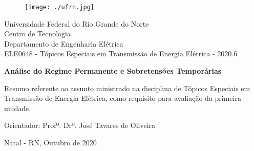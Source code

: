 \begin{titlepage}
	\begin{center}
	
	\begin{figure}[!ht]
	\centering
	\texttt{[image: ./ufrn.jpg]}
	\end{figure}

		Universidade Federal do Rio Grande do Norte \\ Centro de Tecnologia \\ Departamento de Engenharia Elétrica \\  ELE0648 - Tópicos Especiais em Transmissão de Energia Elétrica  - 2020.6 \\
\vspace{15pt}
        
        \vspace{85pt}
        
		\textbf{\Large{Análise do Regime Permanente e Sobretensões Temporárias}}\\
			
	\end{center}
\vspace{1,5cm}
	
	\begin{flushright}

   \begin{list}{}{
      \setlength{\leftmargin}{4.5cm}
      \setlength{\rightmargin}{0cm}
      \setlength{\labelwidth}{0pt}
      \setlength{\labelsep}{\leftmargin}}

      \item Resumo referente ao assunto ministrado na disciplina de Tópicos Especiais em Transmissão de Energia Elétrica, como requisito para avaliação da primeira unidade.

      \begin{list}{}{
      \setlength{\leftmargin}{0cm}
      \setlength{\rightmargin}{0cm}
      \setlength{\labelwidth}{0pt}
      \setlength{\labelsep}{\leftmargin}}


            \item Orientador: Profº. Drº. José Tavares de Oliveira

      \end{list}
   \end{list}
\end{flushright}
\vspace{1cm}
\begin{center}
		\vspace{\fill}
		 Natal - RN, Outubro de 2020
			\end{center}
\end{titlepage}
\newpage